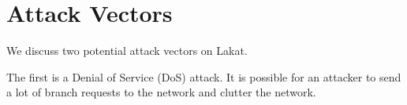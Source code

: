 \section{Attack Vectors}
\label{sc:attackvectors}

We discuss two potential attack vectors on Lakat. 

The first is a Denial of Service (DoS) attack. It is possible for an attacker to send 
a lot of branch requests to the network and clutter the network. 